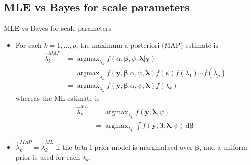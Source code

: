 \documentclass{beamer}\usepackage[]{graphicx}\usepackage[]{color}
\newcommand{\backupend}{
   \addtocounter{framenumbervorappendix}{-\value{framenumber}}
   \addtocounter{framenumber}{\value{framenumbervorappendix}} 
}
\begin{document}
\subsection{MLE vs Bayes for scale parameters}

\begin{frame}{MLE vs Bayes for scale parameters}
	\begin{itemize}
		\item For each $k = 1,\dots,p$, the maximum a posteriori (MAP) estimate is
		\begin{align*}
			\hat\lambda_k^{MAP} &= \mathop{\arg\max}_{\lambda_k} f(\alpha, \boldsymbol{\beta}, \psi, \boldsymbol{\lambda} | \mathbf y)
 \\
			&= \mathop{\arg\max}_{\lambda_k} f(\mathbf y , \boldsymbol{\beta} | \alpha, \psi, \boldsymbol{\lambda}) f(\psi) f(\lambda_1)\cdots f(\lambda_p) \\
			&= \mathop{\arg\max}_{\lambda_k} f(\mathbf y , \boldsymbol{\beta} | \alpha, \psi, \boldsymbol{\lambda}) f(\lambda_k)
		\end{align*}
		whereas the ML estimate is
		\begin{align*}
			\hat\lambda_k^{ML} &= \mathop{\arg\max}_{\lambda_k} f(\mathbf y; \boldsymbol\lambda, \psi) \\
			&= \mathop{\arg\max}_{\lambda_k} \int f(\mathbf y, \boldsymbol\beta ; \boldsymbol\lambda, \psi) \, \text{d}\boldsymbol\beta
		\end{align*}

		\item $\hat\lambda_k^{MAP} = \hat\lambda_k^{ML}$ if the beta I-prior model is marginalised over $\boldsymbol{\beta}$, and a uniform prior is used for each $\lambda_k$.
	\end{itemize}
\end{frame}

\backupend
\end{document}
